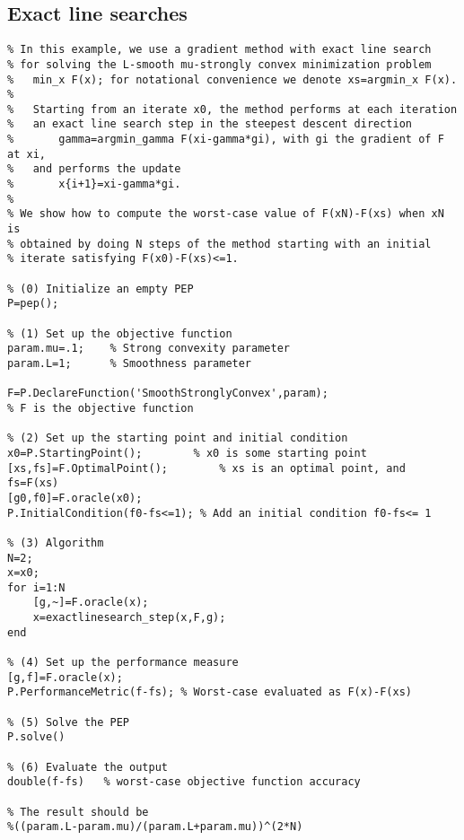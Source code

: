 \documentclass[11pt,a4paper]{article}
\begin{document}
\subsection{Exact line searches}
\begin{lstlisting}
% In this example, we use a gradient method with exact line search
% for solving the L-smooth mu-strongly convex minimization problem
%   min_x F(x); for notational convenience we denote xs=argmin_x F(x).
%
%   Starting from an iterate x0, the method performs at each iteration
%   an exact line search step in the steepest descent direction
%       gamma=argmin_gamma F(xi-gamma*gi), with gi the gradient of F at xi,
%   and performs the update
%       x{i+1}=xi-gamma*gi.
%
% We show how to compute the worst-case value of F(xN)-F(xs) when xN is
% obtained by doing N steps of the method starting with an initial
% iterate satisfying F(x0)-F(xs)<=1.

% (0) Initialize an empty PEP
P=pep();

% (1) Set up the objective function
param.mu=.1;	% Strong convexity parameter
param.L=1;      % Smoothness parameter

F=P.DeclareFunction('SmoothStronglyConvex',param); 
% F is the objective function

% (2) Set up the starting point and initial condition
x0=P.StartingPoint();		 % x0 is some starting point
[xs,fs]=F.OptimalPoint(); 		 % xs is an optimal point, and fs=F(xs)
[g0,f0]=F.oracle(x0);
P.InitialCondition(f0-fs<=1); % Add an initial condition f0-fs<= 1

% (3) Algorithm
N=2;
x=x0;
for i=1:N
    [g,~]=F.oracle(x);
    x=exactlinesearch_step(x,F,g);
end

% (4) Set up the performance measure
[g,f]=F.oracle(x);
P.PerformanceMetric(f-fs); % Worst-case evaluated as F(x)-F(xs)

% (5) Solve the PEP
P.solve()

% (6) Evaluate the output
double(f-fs)   % worst-case objective function accuracy

% The result should be
%((param.L-param.mu)/(param.L+param.mu))^(2*N)
\end{lstlisting}
\newpage
\end{document}
